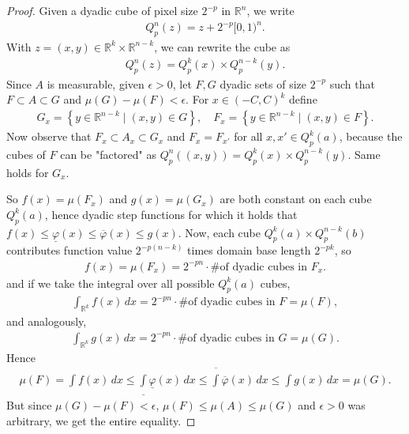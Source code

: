 \begin{proof}
	Given a dyadic cube of pixel size $2^{-p}$ in $\mathbb{R}^{n}$, we write
	\begin{align*}
		Q_{p}^{n}(z) = z + 2^{-p}[0,1)^{n}.
	\end{align*}
	With $z = (x,y) \in \mathbb{R}^{k} \times \mathbb{R}^{n-k}$, we can rewrite the cube as
	\begin{align*}
		Q_{p}^{n}(z) = Q_{p}^{k}(x) \times Q_{p}^{n-k}(y).
	\end{align*}
	Since $A$ is measurable, given $\epsilon > 0$, let $F, G$ dyadic sets of size $2^{-p}$ such that $F \subset A \subset G$ and $\mu(G) - \mu(F) < \epsilon$. For $x \in (-C, C)^{k}$ define
	\begin{align*}
		G_{x} = \left\{ y \in \mathbb{R}^{n-k} \mid (x,y) \in G \right\}, \quad F_{x} = \left\{ y \in \mathbb{R}^{n-k} \mid (x,y) \in F \right\}.
	\end{align*}
	Now observe that $F_{x} \subset A_{x} \subset G_{x}$ and $F_{x} = F_{x'}$ for all $x, x' \in Q^{k}_{p}(a)$, because the cubes of $F$ can be "factored" as $Q_{p}^{n}((x,y)) = Q_{p}^{k}(x) \times Q_{p}^{n-k}(y)$. Same holds for $G_{x}$.

	So $f(x) = \mu(F_{x})$ and $g(x) = \mu(G_{x})$ are both constant on each cube $Q_{p}^{k}(a)$, hence dyadic step functions for which it holds that $f(x) \leq \underline{ \varphi }(x) \leq \overline{ \varphi }(x) \leq g(x)$. Now, each cube $Q_{p}^{k}(a) \times Q_{p}^{n-k}(b)$ contributes function value $2^{-p(n-k)}$ times domain base length $2^{-pk}$, so 
	\begin{align*}
		f(x) = \mu(F_{x}) = 2^{-pn} \cdot \text{\# of dyadic cubes in $F_x$}.
	\end{align*}
    and if we take the integral over all possible $Q_{p}^{k}(a)$ cubes, 
	\begin{align*}
		\int_{\mathbb{R}^{k}} f(x) \, dx = 2^{-pn} \cdot \text{\# of dyadic cubes in $F$} = \mu(F),
	\end{align*}
	and analogously,
	\begin{align*}
		\int_{\mathbb{R}^{k}} g(x) \, dx = 2^{-pn} \cdot \text{\# of dyadic cubes in $G$} = \mu(G).
	\end{align*}
	Hence
	\begin{align*}
		\mu(F) = \int f(x) \, dx \leq \underline{ \int } \underline{ \varphi }(x) \, dx \leq \overline{ \int } \overline{ \varphi } (x) \, dx \leq \int g(x) \, dx = \mu(G).
	\end{align*}
	But since $\mu(G) - \mu(F) < \epsilon$, $\mu(F) \leq \mu(A) \leq \mu(G)$ and $\epsilon > 0$ was arbitrary, we get the entire equality.
\end{proof}



